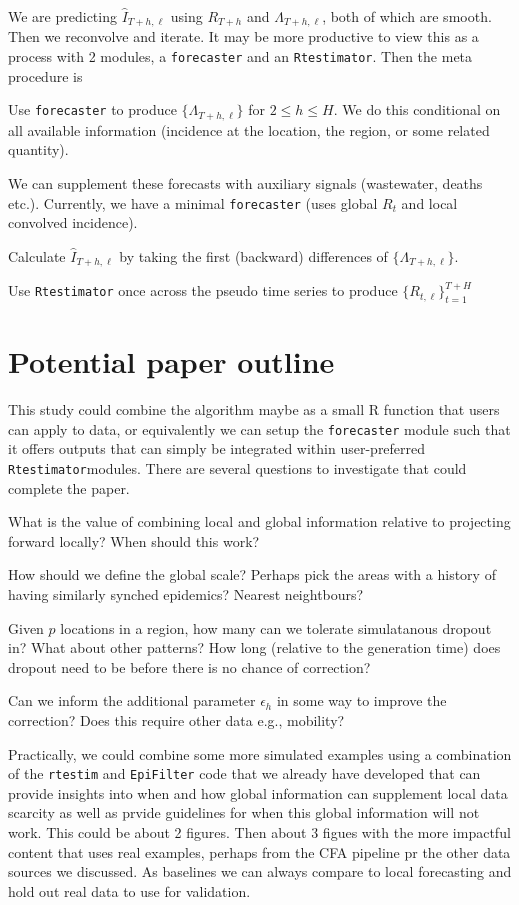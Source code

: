 \documentclass[12pt]{article}
\begin{document}
We are predicting $\hat{I}_{T + h, \ell}$ using $R_{T+h}$ and
$\Lambda_{T+h, \ell}$, both of which are smooth. Then we reconvolve and
iterate. It may be more productive to view this as a process with 2 modules, a
\texttt{forecaster} and an \texttt{Rtestimator}. Then the meta procedure is

\benum
\item Use \texttt{forecaster} to produce $\{\Lambda_{T+h, \ell}\}$ for $2\leq h
\leq H$. We do this conditional on all available information (incidence at the
location, the region, or some related quantity). 
\item We can supplement these forecasts with auxiliary signals (wastewater,
deaths etc.). Currently, we have a minimal \texttt{forecaster} (uses global $R_t$
and local convolved incidence).
\item Calculate $\hat{I}_{T+h, \ell}$ by taking the first (backward) differences
of $\{\Lambda_{T+h, \ell}\}$.
\item Use \texttt{Rtestimator} once across the pseudo time series to produce
$\{R_{t, \ell}\}_{t=1}^{T+H}$
\eenum

\section*{Potential paper outline}\label{sec:outline}

This study could combine the algorithm maybe as a small R function that users
can apply to data, or equivalently we can setup the \texttt{forecaster} module
such that it offers outputs that can simply be integrated within user-preferred
\texttt{Rtestimator}modules. There are several questions to investigate that
could complete the paper. 


\bitem
\item What is the value of combining local and global information relative to
projecting forward locally? When should this work?
\item How should we define the global scale? Perhaps pick the areas with a
history of having similarly synched epidemics? Nearest neightbours?
\item Given $p$ locations in a region, how many can we tolerate simulatanous
dropout in? What about other patterns? How long (relative to the generation
time) does dropout need to be before there is no chance of correction?
\item Can we inform the additional parameter $\epsilon_h$ in some way to improve
the correction? Does this require other data e.g., mobility?
\eitem

Practically, we could combine some more simulated examples using a combination
of the \texttt{rtestim} and \texttt{EpiFilter} code that we already have
developed that can provide insights into when and how global information can
supplement local data scarcity as well as prvide guidelines for when this global
information will not work. This could be about 2 figures. Then about 3 figues
with the more impactful content that uses real examples, perhaps from the CFA
pipeline pr the other data sources we discussed. As baselines we can always
compare to local forecasting and hold out real data to use for validation. 
\end{document}
